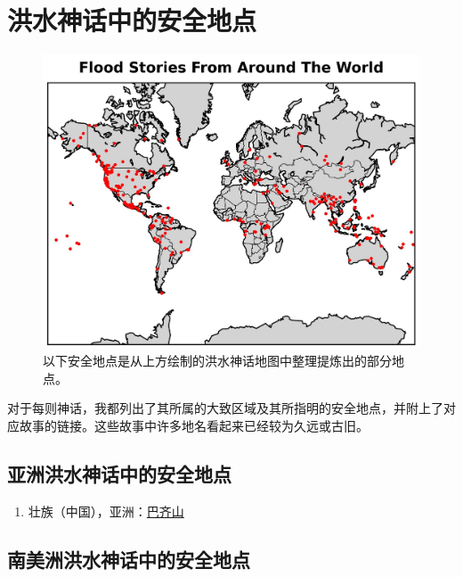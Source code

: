 \documentclass[10pt,twocolumn,letterpaper]{article}
\begin{document}
\section{洪水神话中的安全地点}

\begin{figure}[H]
\begin{center}
   \includegraphics[width=1\linewidth]{flood.jpg}
\end{center}
   \caption{以下安全地点是从上方绘制的洪水神话地图中整理提炼出的部分地点\cite{2,17}。}
\label{fig:21}
\label{fig:onecol}
\end{figure}

对于每则神话，我都列出了其所属的大致区域及其所指明的安全地点，并附上了对应故事的链接。这些故事中许多地名看起来已经较为久远或古旧。
\subsection{亚洲洪水神话中的安全地点}

\begin{flushleft}
\begin{enumerate}
\item 壮族（中国），亚洲：\href{http://www.talkorigins.org/faqs/flood-myths.html#Zhuang}{巴齐山}
\end{enumerate}
\end{flushleft}

\subsection{南美洲洪水神话中的安全地点}
\end{document}
